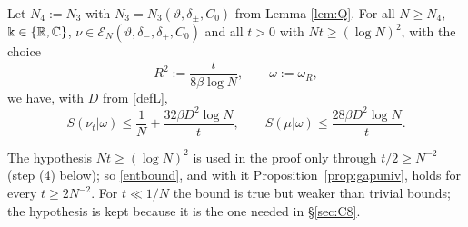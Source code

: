 \begin{theorem}\label{thm:entropy}
Let $N_4:=N_3$ with $N_3=N_3(\vartheta,\delta_\pm,C_0)$ from Lemma \ref{lem:Q}. For all $N\ge N_4$, $\Bbbk\in\{\mathbb{R},\mathbb{C}\}$, $\nu\in\mathcal E_N(\vartheta,\delta_-,\delta_+,C_0)$ and all $t>0$ with $Nt\ge(\log N)^2$, with the choice
\begin{equation}\label{Rchoice}
R^2:=\frac{t}{8\beta\log N},\qquad \omega:=\omega_R,
\end{equation}
we have, with $D$ from \eqref{defL},
\begin{equation}\label{entbound}
S(\nu_t|\omega)\le\frac1N+\frac{32\beta D^2\log N}{t},\qquad S(\mu|\omega)\le\frac{28\beta D^2\log N}{t}.
\end{equation}
\end{theorem}
\noindent The hypothesis $Nt\ge(\log N)^2$ is used in the proof only through $t/2\ge N^{-2}$ (step (4) below); so \eqref{entbound}, and with it Proposition~\ref{prop:gapuniv}, holds for every $t\ge2N^{-2}$.
For $t\ll1/N$ the bound is true but weaker than trivial bounds; the hypothesis is kept because it is the one needed in \S\ref{sec:C8}.


